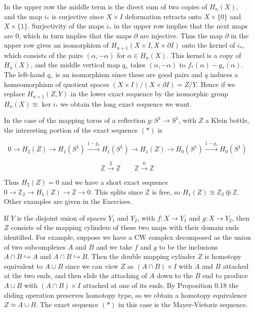 In the upper row the middle term is the direct sum of two copies of $H_n(X)$, and the map $i_*$ is surjective since $X \times I$ deformation retracts onto $X \times \{0\}$ and $X \times \{1\}$. Surjectivity of the maps $i_*$ in the upper row implies that the next maps are $0$, which in turn implies that the maps $\partial$ are injective. Thus the map $\partial$ in the upper row gives an isomorphism of $H_{n+1}(X \times I, X \times \partial I)$ onto the kernel of $i_*$, which consists of the pairs $(\alpha, -\alpha)$ for $\alpha \in H_n(X)$. This kernel is a copy of $H_n(X)$, and the middle vertical map $q_*$ takes $(\alpha, -\alpha)$ to $f_*(\alpha) - g_*(\alpha)$. The left-hand $q_*$ is an isomorphism since these are good pairs and $q$ induces a homeomorphism of quotient spaces $(X \times I)/(X \times \partial I) = Z/Y$. Hence if we replace $H_{n+1}(Z, Y)$ in the lower exact sequence by the isomorphic group $H_n(X) \cong \ker i_*$ we obtain the long exact sequence we want.

In the case of the mapping torus of a reflection $g: S^1 \to S^1$, with $Z$ a Klein bottle, the interesting portion of the exact sequence $(*)$ is

\[
0 \to H_2(Z) \to H_1(S^1) \xrightarrow{1-g_*} H_1(S^1) \to H_1(Z) \to H_0(S^1) \xrightarrow{1-g_*} H_0(S^1)
\]

\[
\mathbb{Z} \xrightarrow{2} \mathbb{Z} \quad\quad \mathbb{Z} \xrightarrow{0} \mathbb{Z}
\]

Thus $H_2(Z) = 0$ and we have a short exact sequence $0 \to \mathbb{Z}_2 \to H_1(Z) \to \mathbb{Z} \to 0$. This splits since $\mathbb{Z}$ is free, so $H_1(Z) \cong \mathbb{Z}_2 \oplus \mathbb{Z}$. Other examples are given in the Exercises.

If $Y$ is the disjoint union of spaces $Y_1$ and $Y_2$, with $f: X \to Y_1$ and $g: X \to Y_2$, then $Z$ consists of the mapping cylinders of these two maps with their domain ends identified. For example, suppose we have a CW complex decomposed as the union of two subcomplexes $A$ and $B$ and we take $f$ and $g$ to be the inclusions $A \cap B \hookrightarrow A$ and $A \cap B \hookrightarrow B$. Then the double mapping cylinder $Z$ is homotopy equivalent to $A \cup B$ since we can view $Z$ as $(A \cap B) \times I$ with $A$ and $B$ attached at the two ends, and then slide the attaching of $A$ down to the $B$ end to produce $A \cup B$ with $(A \cap B) \times I$ attached at one of its ends. By Proposition 0.18 the sliding operation preserves homotopy type, so we obtain a homotopy equivalence $Z \simeq A \cup B$. The exact sequence $(\ast)$ in this case is the Mayer-Vietoris sequence.

